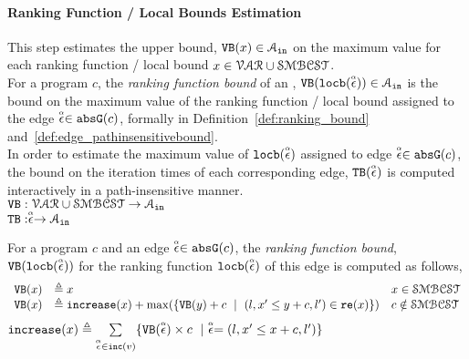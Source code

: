 \paragraph{Ranking Function / Local Bounds Estimation}
This step estimates the upper bound, $\varinvar(x) \in \mathcal{A}_{\lin}$
on the maximum value for each ranking function / local bound $x \in  \mathcal{VAR} \cup \constdom$.
\\
For a program $c$, the \emph{ranking function bound} of an ,
$\varinvar(\locbound(\absevent)) \in \mathcal{A}_{\lin}$ is 
the bound on the maximum value of the ranking function / local bound
assigned to the edge $\absevent \in \absG(c)$, formally in Definition~\ref{def:ranking_bound} and~\ref{def:edge_pathinsensitivebound}.
\\
In order to estimate the maximum value of $\locbound(\absevent)$ assigned to edge $\absevent \in \absG(c)$,
the bound on the iteration times of each corresponding edge, $\absclr(\absevent)$ 
is computed interactively in a path-insensitive manner.
\\ 
$ \varinvar: \mathcal{VAR} \cup \constdom \to \mathcal{A}_{\lin}$
\\
$\absclr: \absevent \to \mathcal{A}_{\lin}$
\begin{defn}
  \label{def:ranking_bound}
For a program $c$ and an edge $\absevent \in \absG(c)$,
the \emph{ranking function bound}, $\varinvar(\locbound(\absevent))$ for the ranking function $\locbound(\absevent)$
of this edge
is computed as follows,
  \[ 
\begin{array}{lll}
  \varinvar(x) & \triangleq x & x \in \constdom \\
  \varinvar(x) & \triangleq \incrs(x) + \max(\{\varinvar(y) + c ~\mid~ (l, x' \leq y + c, l') \in \reset(x)\}) & c \notin \constdom
\end{array}
\]
%
$\incrs(x) \triangleq \sum\limits_{\absevent \in \inc(v)}\{\varinvar(\absevent) \times c ~\mid~ \absevent = (l, x' \leq x + c, l')\}$
\end{defn}
